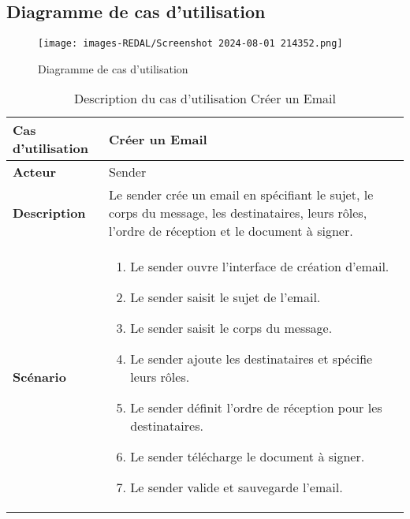 \subsection{Diagramme de cas d'utilisation}
\begin{figure}[H]
\begin{center}
\texttt{[image: images-REDAL/Screenshot 2024-08-01 214352.png]}
\end{center}
\caption{Diagramme de cas d’utilisation}
\end{figure}








\begin{table}[H]
\centering
\begin{tabular}{|l|p{12cm}|}
\hline
\textbf{Cas d’utilisation} & Créer un Email 
\\ \hline
\textbf{Acteur} & Sender 
\\ \hline
\textbf{Description} & Le sender crée un email en spécifiant le sujet, le corps du message, les destinataires, leurs rôles, l'ordre de réception et le document à signer. 
\\ \hline
\textbf{Scénario} &
\begin{enumerate}
\item Le sender ouvre l'interface de création d'email.
\item Le sender saisit le sujet de l'email.
\item Le sender saisit le corps du message.
\item Le sender ajoute les destinataires et spécifie leurs rôles.
\item Le sender définit l'ordre de réception pour les destinataires.
\item Le sender télécharge le document à signer.
\item Le sender valide et sauvegarde l'email.
\end{enumerate} 
\\ \hline
\end{tabular}
\caption{Description du cas d’utilisation Créer un Email}
\label{Description du cas d’utilisation Créer un Email}
\end{table}





